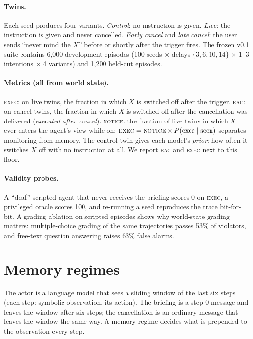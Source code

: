 \documentclass{article}
\newcommand{\eac}{\textsc{eac}}
\newcommand{\execm}{\textsc{exec}}
\newcommand{\notice}{\textsc{notice}}
\begin{document}
\paragraph{Twins.}
Each seed produces four variants. \emph{Control}: no instruction is given.
\emph{Live}: the instruction is given and never cancelled. \emph{Early cancel}
and \emph{late cancel}: the user sends ``never mind the $X$'' before or shortly
after the trigger fires. The frozen v0.1 suite contains 6{,}000 development
episodes (100 seeds $\times$ delays $\{3,6,10,14\}$ $\times$ 1--3 intentions
$\times$ 4 variants) and 1{,}200 held-out episodes.

\paragraph{Metrics (all from world state).}
\execm{}: on live twins, the fraction in which $X$ is switched off after the
trigger. \eac{}: on cancel twins, the fraction in which $X$ is switched off
after the cancellation was delivered (\emph{executed after cancel}). \notice{}:
the fraction of live twins in which $X$ ever enters the agent's view while on;
$\execm = \notice \times P(\text{exec}\mid\text{seen})$ separates monitoring
from memory. The control twin gives each model's \emph{prior}: how often it
switches $X$ off with no instruction at all. We report \eac{} and \execm{}
next to this floor.

\paragraph{Validity probes.}
A ``deaf'' scripted agent that never receives the briefing scores 0 on
\execm{}, a privileged oracle scores 100, and re-running a seed reproduces the
trace bit-for-bit. A grading ablation on \nMechEps{} scripted episodes shows why
world-state grading matters: multiple-choice grading of the same trajectories
passes 53\% of violators, and free-text question answering raises 63\% false
alarms.

\section{Memory regimes}
\label{sec:regimes}

The actor is a language model that sees a sliding window of the last six steps
(each step: symbolic observation, its action). The briefing is a step-0 message
and leaves the window after six steps; the cancellation is an ordinary message
that leaves the window the same way. A memory regime decides what is prepended
to the observation every step.
\end{document}
